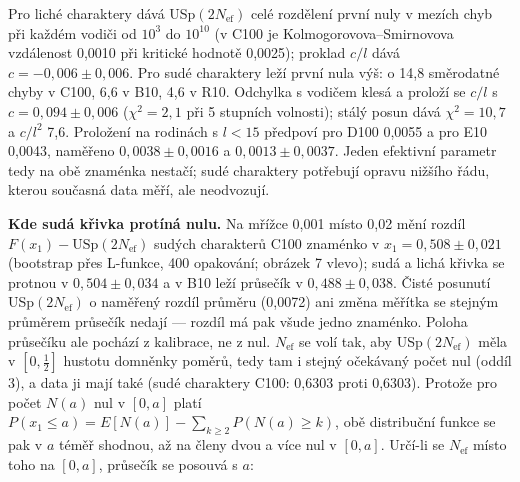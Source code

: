 \documentclass[
  10pt,
]{article}
\begin{document}
Pro liché charaktery dává USp\((2N_{\mathrm{ef}})\) celé rozdělení první
nuly v mezích chyb při každém vodiči od \(10^3\) do \(10^{10}\) (v C100
je Kolmogorovova--Smirnovova vzdálenost 0,0010 při kritické hodnotě
0,0025); proklad \(c/l\) dává \(c = -0{,}006 \pm 0{,}006\). Pro sudé
charaktery leží první nula výš: o 14,8 směrodatné chyby v C100, 6,6 v
B10, 4,6 v R10. Odchylka s vodičem klesá a proloží se \(c/l\) s
\(c = 0{,}094 \pm 0{,}006\) (\(\chi^2 = 2{,}1\) při 5 stupních
volnosti); stálý posun dává \(\chi^2 = 10{,}7\) a \(c/l^2\) 7,6.
Proložení na rodinách s \(l < 15\) předpoví pro D100 0,0055 a pro E10
0,0043, naměřeno \(0{,}0038 \pm 0{,}0016\) a \(0{,}0013 \pm 0{,}0037\).
Jeden efektivní parametr tedy na obě znaménka nestačí; sudé charaktery
potřebují opravu nižšího řádu, kterou současná data měří, ale
neodvozují.

\textbf{Kde sudá křivka protíná nulu.} Na mřížce 0,001 místo 0,02 mění
rozdíl \(F(x_1) - \mathrm{USp}(2N_{\mathrm{ef}})\) sudých charakterů
C100 znaménko v \(x_1 = 0{,}508 \pm 0{,}021\) (bootstrap přes L-funkce,
400 opakování; obrázek 7 vlevo); sudá a lichá křivka se protnou v
\(0{,}504 \pm 0{,}034\) a v B10 leží průsečík v \(0{,}488 \pm 0{,}038\).
Čisté posunutí USp\((2N_{\mathrm{ef}})\) o naměřený rozdíl průměru
(0,0072) ani změna měřítka se stejným průměrem průsečík nedají ---
rozdíl má pak všude jedno znaménko. Poloha průsečíku ale pochází z
kalibrace, ne z nul. \(N_{\mathrm{ef}}\) se volí tak, aby
USp\((2N_{\mathrm{ef}})\) měla v \([0, \frac12]\) hustotu domněnky
poměrů, tedy tam i stejný očekávaný počet nul (oddíl 3), a data ji mají
také (sudé charaktery C100: 0,6303 proti 0,6303). Protože pro počet
\(N(a)\) nul v \([0, a]\) platí
\(P(x_1 \le a) = E[N(a)] - \sum_{k \ge 2} P(N(a) \ge k)\), obě
distribuční funkce se pak v \(a\) téměř shodnou, až na členy dvou a více
nul v \([0, a]\). Určí-li se \(N_{\mathrm{ef}}\) místo toho na
\([0, a]\), průsečík se posouvá s \(a\):
\end{document}
